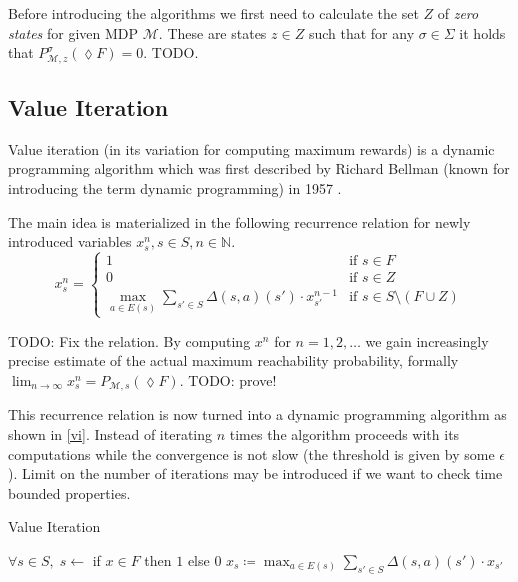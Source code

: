 Before introducing the algorithms we first need to calculate the set $Z$
of {\em zero states} for given MDP $\mathcal{M}$. These are states $z
\in Z$ such that for any $\sigma \in \Sigma$ it holds that
$P^\sigma_{\mathcal{M},z}(\lozenge F) = 0$. TODO.

\subsection{Value Iteration}

Value iteration (in its variation for computing maximum rewards) is a
dynamic programming algorithm which was first described by Richard
Bellman (known for introducing the term dynamic programming) in 1957
\parencite{bellman}.

The main idea is materialized in the following recurrence relation for
newly introduced variables $x_s^n, s \in S, n \in \mathbb{N}$.
\[
x_s^n =
\begin{cases}
    1 & \text{if }s \in F \\
    0 & \text{if }s \in Z \\

    \max_{a \in E(s)} \sum_{s' \in S} \Delta(s,a)(s') \cdot x_{s'}^{n-1}
    & \text{if }s \in S \setminus (F \cup Z)
\end{cases}
\]

TODO: Fix the relation.
By computing $x^n$ for $n = 1,2,\ldots$ we gain increasingly precise
estimate of the actual maximum reachability probability,
formally $\lim_{n \to \infty} x^n_s = P_{\mathcal{M},s}(\lozenge F)$.
TODO: prove!

This recurrence relation is now turned into a dynamic programming
algorithm as shown in \autoref{vi}. Instead of iterating $n$ times the
algorithm proceeds with its computations while the convergence is not
slow (the threshold is given by some $\epsilon$). Limit on the number of
iterations may be introduced if we want to check time bounded
properties.

\begin{algorithm}
\caption{Value Iteration}
\label{vi}
\begin{algorithmic}
    \State $\forall s \in S,\; s \gets$ if $x \in F$ then $1$ else $0$
    \Do
            \State $x_s \coloneqq
                \max_{a \in E(s)} \sum_{s' \in S} \Delta(s,a)(s') \cdot x_{s'}$
        \EndFor
\end{algorithmic}
\end{algorithm}

